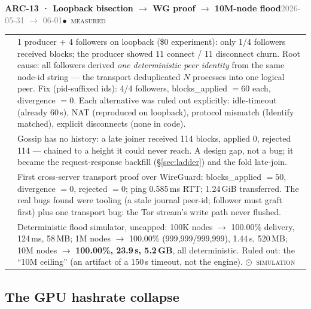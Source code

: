 \documentclass[10pt,a4paper]{article}
\makeatletter
\newcommand{\stM}{\textcolor{sigilcyan}{$\bullet$}~{\scriptsize\textcolor{sigilcyan}{\textsc{measured}}}}
\newcommand{\stS}{\textcolor{sigilblue}{$\odot$}~{\scriptsize\textcolor{sigilblue}{\textsc{simulation}}}}
\newcommand{\measured}[1]{\textcolor{sigilcyan}{\textbf{#1}}}
\newcommand{\frow}[2]{{\footnotesize\textcolor{gray}{\textsc{#1}}}\;&\small #2\\}
\newenvironment{mentry}[4]{%
\begin{tcolorbox}[enhanced,breakable,colback=white,colframe=slate,boxrule=0.6pt,arc=2pt,
  left=8pt,right=8pt,top=6pt,bottom=6pt,
  borderline west={3pt}{0pt}{sigilcyan!70!slate}]
{\small\textbf{#1 · #2}\hfill{\footnotesize\textcolor{gray}{#3}}\quad#4}\\[4pt]
\begin{tabular}{@{}>{\raggedleft\arraybackslash}p{1.8cm}p{13.2cm}@{}}
}{%
\end{tabular}
\end{tcolorbox}\vspace{2pt}}
\makeatother
\begin{document}
\begin{mentry}{ARC-13}{Loopback bisection $\to$ WG proof $\to$ 10M-node flood}{2026-05-31 $\to$ 06-01}{\stM}
\frow{bisect}{1 producer + 4 followers on loopback (\$0 experiment): only 1/4 followers
received blocks; the producer showed 11 connect / 11 disconnect churn. Root cause: all
followers derived \emph{one deterministic peer identity} from the same node-id string ---
the transport deduplicated $N$ processes into one logical peer. Fix (pid-suffixed ids):
4/4 followers, blocks\_applied $=60$ each, divergence $=0$. Each alternative was ruled out
explicitly: idle-timeout (already 60\,s), NAT (reproduced on loopback), protocol mismatch
(Identify matched), explicit disconnects (none in code).}
\frow{2nd cause}{Gossip has no history: a late joiner received 114 blocks, applied 0,
rejected 114 --- chained to a height it could never reach. A design gap, not a bug; it
became the request-response backfill (\S\ref{sec:ladder}) and the fold late-join.}
\frow{wg}{First cross-server transport proof over WireGuard: blocks\_applied $=50$,
divergence $=0$, rejected $=0$; ping 0.585\,ms RTT; 1.24\,GiB transferred. The real bugs
found were tooling (a stale journal peer-id; follower must graft first) plus one transport
bug: the Tor stream's write path never flushed.}
\frow{flood}{Deterministic flood simulator, uncapped: 100K nodes $\to$ 100.00\% delivery,
124\,ms, 58\,MB; 1M nodes $\to$ 100.00\% (999{,}999/999{,}999), 1.44\,s, 520\,MB; 10M
nodes $\to$ \measured{100.00\%, 23.9\,s, 5.2\,GB}, all deterministic. Ruled out: the
``10M ceiling'' (an artifact of a 150\,s timeout, not the engine). \stS}
\end{mentry}

\subsection{The GPU hashrate collapse}
\end{document}
